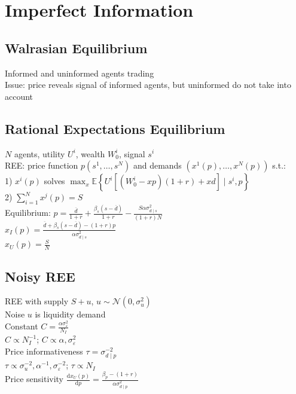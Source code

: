 \section{Imperfect Information}
	\subsection*{Walrasian Equilibrium}
	Informed and uninformed agents trading\\
	Issue: price reveals signal of informed agents, but uninformed do not take into account
	
	\subsection*{Rational Expectations Equilibrium}
	$N$ agents, utility $U^{i}$, wealth $W^{i}_{0}$, signal $s^{i}$\\
	REE: price function $p\left(s^{1}, \dots, s^{N}\right)$ and demands $\left(x^{1}\left(p\right), \dots, x^{N}\left(p\right)\right)$ s.t.:\\
	1) $x^{i}\left(p\right)$ solves $\max_{x}\mathbb{E}\left\{U^{i}\left[\left(W_{0}^{i} - xp\right)\left(1 + r\right) + xd\right]\mid s^{i}, p\right\}$\\
	2) $\sum_{i=1}^{N}x^{j}\left(p\right) = S$\\
	Equilibrium: $p = \frac{\overline{d}}{1 + r} + \frac{\beta_{s}\left(s - \overline{d}\right)}{1 + r} - \frac{S\alpha\sigma^{2}_{d\mid s}}{\left(1 + r\right)N}$\\
	$x_{I}\left(p\right) = \frac{\overline{d} + \beta_{s}\left(s - \overline{d}\right) - \left(1 + r\right)p}{\alpha\sigma^{2}_{d\mid s}}$\\
	$x_{U}\left(p\right) = \frac{S}{N}$
	
	\subsection*{Noisy REE}
	REE with supply $S + u$, $u\sim\mathcal{N}\left(0, \sigma^{2}_{u}\right)$\\
	Noise $u$ is liquidity demand\\
	Constant $C = \frac{\alpha\sigma^{2}_{\varepsilon}}{N_{I}}$\\
	$C\propto N_{I}^{-1}$; $C\propto\alpha, \sigma^{2}_{\varepsilon}$\\
	Price informativeness $\tau = \sigma^{-2}_{d\mid p}$\\
	$\tau\propto\sigma^{-2}_{u}, \alpha^{-1}, \sigma^{-2}_{\varepsilon}$; $\tau\propto N_{I}$\\
	Price sensitivity $\frac{\mathrm{d}x_{U}\left(p\right)}{\mathrm{d}p} = \frac{\beta_{p} - \left(1 + r\right)}{\alpha\sigma^{2}_{d\mid p}}$
	
